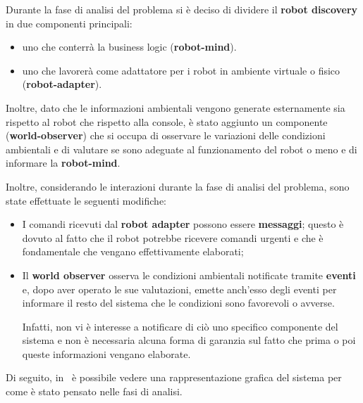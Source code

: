 \documentclass{llncs}
\begin{document}
Durante la fase di analisi del problema si è deciso di dividere il \textbf{robot discovery} in due componenti principali:

\begin{itemize}
  \item uno che conterrà la business logic (\textbf{robot-mind}).
  \item uno che lavorerà come adattatore per i robot in ambiente virtuale o fisico (\textbf{robot-adapter}).
\end{itemize}

Inoltre, dato che le informazioni ambientali vengono generate esternamente sia rispetto al robot che rispetto alla console,
è stato aggiunto un componente (\textbf{world-observer}) che si occupa di osservare le variazioni delle condizioni ambientali e di valutare se sono adeguate al funzionamento del robot o meno e di informare la \textbf{robot-mind}.

Inoltre, considerando le interazioni durante la fase di analisi del problema, sono state effettuate le seguenti modifiche:

\begin{itemize}
    \item
      I comandi ricevuti dal \textbf{robot adapter} possono essere \textbf{messaggi};
      questo è dovuto al fatto che il robot potrebbe ricevere comandi urgenti e che è fondamentale che vengano effettivamente elaborati;
    \item
      Il \textbf{world observer} osserva le condizioni ambientali notificate tramite \textbf{eventi} e, dopo aver operato le sue valutazioni, emette anch'esso degli eventi per informare il resto del sistema che le condizioni sono favorevoli o avverse.

      Infatti, non vi è interesse a notificare di ciò uno specifico componente del sistema e non è necessaria alcuna forma di garanzia sul fatto che prima o poi queste informazioni vengano elaborate.
\end{itemize}

Di seguito, in~ è possibile vedere una rappresentazione grafica del sistema per come è stato pensato nelle fasi di analisi.
\end{document}
